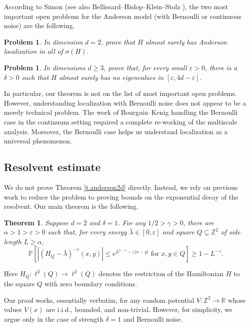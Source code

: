 \documentclass{amsart}
\newtheorem{theorem}[equation]{Theorem}
\newtheorem{problem}[equation]{Problem}
\newcommand{\tref}[1]{Theorem \ref{t.#1}}
\numberwithin{equation}{section}
\numberwithin{figure}{section}
\newcommand{\Z}{\mathbb{Z}}
\newcommand{\R}{\mathbb{R}}
\renewcommand{\P}{\mathbb{P}}
\newcommand{\ep}{\varepsilon}
\begin{document}
According to Simon \cite{Simon} (see also Bellissard--Hislop--Klein--Stolz \cite{Bellissard-Hislop-Klein-Stolz}), the two most important open problems for the Anderson model (with Bernoulli or continuous noise) are the following.

\begin{problem}
In dimension $d = 2$, prove that $H$ almost surely has Anderson localization in all of $\sigma(H)$. 
\end{problem}

\begin{problem}
In dimensions $d \geq 3$, prove that, for every small $\ep > 0$, there is a $\delta > 0$ such that $H$ almost surely has no eigenvalues in $[\ep,4d-\ep]$.
\end{problem}

In particular, our theorem is not on the list of most important open problems.  However, understanding localization with Bernoulli noise does not appear to be a merely technical problem.  The work of Bourgain--Kenig \cite{Bourgain-Kenig} handling the Bernoulli case in the continuum setting required a complete re-working of the multiscale analysis.  Moreover, the Bernoulli case helps us understand localization as a universal phenomenon.

\subsection{Resolvent estimate}

We do not prove \tref{anderson2d} directly.  Instead, we rely on previous work to reduce the problem to proving bounds on the exponential decay of the resolvent.  Our main theorem is the following.

\begin{theorem}
\label{t.main}
Suppose $d = 2$ and $\delta = 1$.  For any $1/2 > \gamma > 0$, there are $\alpha > 1 > \ep > 0$ such that, for every energy $\bar \lambda \in [0,\ep]$ and square $Q \subseteq \Z^2$ of side length $L \geq \alpha$,
\begin{equation*}
\P[|(H_Q - \bar \lambda)^{-1}(x,y)| \leq e^{L^{1-\ep} - \ep |x - y|} \mbox{ for } x, y \in Q] \geq 1 - L^{-\gamma}.
\end{equation*}
\end{theorem}

Here $H_Q : \ell^2(Q) \to \ell^2(Q)$ denotes the restriction of the Hamiltonian $H$ to the square $Q$ with zero boundary conditions.  

Our proof works, essentially verbatim, for any random potential $V : \Z^2 \to \R$ whose values $V(x)$ are i.i.d., bounded, and non-trivial.  However, for simplicity, we argue only in the case of strength $\delta = 1$ and Bernoulli noise.
\end{document}
